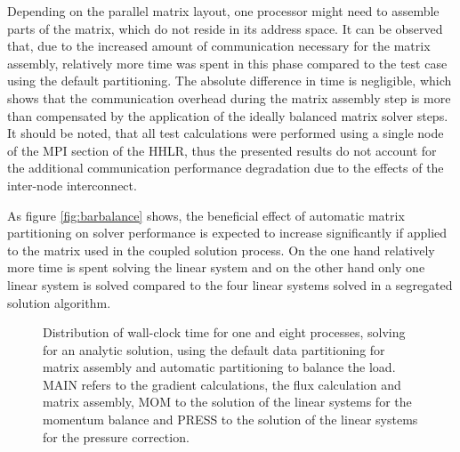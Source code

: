 Depending on the parallel matrix layout, one processor might need to assemble parts of the matrix, which do not reside in its address space. It can be observed that, due to the increased amount of communication necessary for the matrix assembly, relatively more time was spent in this phase compared to the test case using the default partitioning. The absolute difference in time is negligible, which shows that the communication overhead during the matrix assembly step is more than compensated by the application of the ideally balanced matrix solver steps. It should be noted, that all test calculations were performed using a single node of the MPI section of the HHLR, thus the presented results do not account for the additional communication performance degradation due to the effects of the inter-node interconnect.

As figure \ref{fig:barbalance} shows, the beneficial effect of automatic matrix partitioning on solver performance is expected to increase significantly if applied to the matrix used in the coupled solution process. On the one hand relatively more time is spent solving the linear system and on the other hand only one linear system is solved compared to the four linear systems solved in a segregated solution algorithm.

\begin{figure}[h!]
\hfil
\caption{Distribution of wall-clock time for one and eight processes, solving for an analytic solution, using the default data partitioning for matrix assembly and automatic partitioning to balance the load. MAIN refers to the gradient calculations, the flux calculation and matrix assembly, MOM to the solution of the linear systems for the momentum balance and PRESS to the solution of the linear systems for the pressure correction.}
\label{fig:distseg}
\end{figure}


